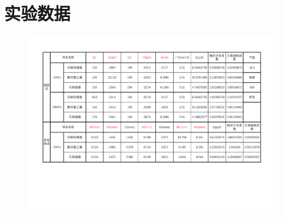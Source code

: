 \documentclass[a4paper,utf8]{article}
\begin{document}
\section*{实验数据}
    \begin{figure}[!ht]\centering
        \includegraphics[width=150mm]{A12-data.pdf}
    \end{figure}
\end{document}
